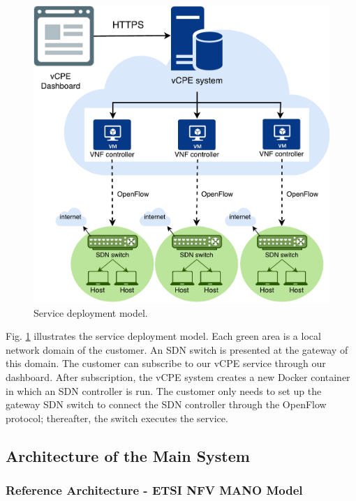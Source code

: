 \begin{figure}[!t]
\centering
\includegraphics[width=\textwidth]{./fig/hsnl_service_deployment}
\caption{Service deployment model.}
\label{fig:hsnl_service_deployment}
\end{figure}

Fig. \ref{fig:hsnl_service_deployment} illustrates the service deployment model. Each green area is a local network domain of the customer. An SDN switch is presented at the gateway of this domain. The customer can subscribe to our vCPE service through our dashboard. After subscription, the vCPE system creates a new Docker container in which an SDN controller is run. The customer only needs to set up the gateway SDN switch to connect the SDN controller through the OpenFlow protocol; thereafter, the switch executes the service.


\subsection{Architecture of the Main System}
\subsubsection{Reference Architecture - ETSI NFV MANO Model}

